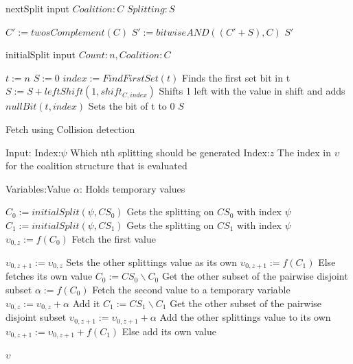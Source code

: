 \documentclass{llncs}
\begin{document}
\begin{algorithm}
\caption{ nextSplit input $Coalition:C$ $Splitting:S$\label{alg:nextsplit}}
\begin{algorithmic}[1]
\STATE $C' := twosComplement(C)$
\STATE $S' := bitwiseAND((C'+S),C)$
\RETURN $S'$
\end{algorithmic}
\end{algorithm}

\begin{algorithm}
\caption{initialSplit input $Count:n, Coalition:C$\label{alg:initalsplit}}
\begin{algorithmic}[1]
\STATE $t := n$
\STATE $S := 0$
 { 
\STATE $index := FindFirstSet(t)$ \hfill Finds the first set bit in t
\STATE $S := S + leftShift(1,shift_{C,index})$ \hfill Shifts 1 left with the value in shift and adds
\STATE $nullBit(t,index)$ \hfill Sets the bit of t to 0
}
\ENDWHILE
\RETURN $S$
\end{algorithmic}
\end{algorithm}

\begin{algorithm}
\caption{Fetch using Collision detection \label{collision}}
Input:
Index:$\psi$ \hfill Which nth splitting should be generated
Index:$z$ \hfill The index in $\upsilon$ for the coalition structure that is evaluated 

Variables:Value $\alpha $: \hfill Holds temporary values

\begin{algorithmic}[1]
    \STATE $C_{0} := initialSplit(\psi,CS_0)$ \label{lst:line:startcol} \hfill Gets the splitting on $CS_0$ with index $\psi$
    \STATE $C_{1} := initialSplit(\psi,CS_1)$ \hfill Gets the splitting on $CS_1$ with index $\psi$
    \STATE $\upsilon_{0,z} := f(C_{0})$ \label{lst:line:fetch} \hfill Fetch the first value
    
     \label{lst:line:firstif} 
      \STATE $\upsilon_{0,z+1} := \upsilon_{0,z}$ \hfill Sets the other splittings value as its own
      \ELSE
      \STATE $\upsilon_{0,z+1} := f(C_{1})$ \hfill Else fetches its own value
     \ENDIF \label{lst:line:firstifend}
    \STATE $C_{0} := CS_0\backslash C_{0}$ \label{lst:line:startend} \hfill Get the other subset of the pairwise disjoint subset
    \STATE $\alpha := f(C_{0})$ \hfill Fetch the second value to a temporary variable
    \STATE $\upsilon_{0,z} := \upsilon_{0,z}  + \alpha$ \label{lst:line:endend} \hfill Add it
    \STATE $C_{1} := CS_1\backslash C_{1}$ \hfill Get the other subset of the pairwise disjoint subset
      \STATE $\upsilon_{0,z+1} := \upsilon_{0,z+1}  + \alpha$ \hfill Add the other splittings value to its own
    \ELSE
      \STATE $\upsilon_{0,z+1} := \upsilon_{0,z+1} + f(C_{1})$ \hfill Else add its own value
    \ENDIF
    
\RETURN $\upsilon$
\end{algorithmic}
\end{algorithm}
\end{document}
